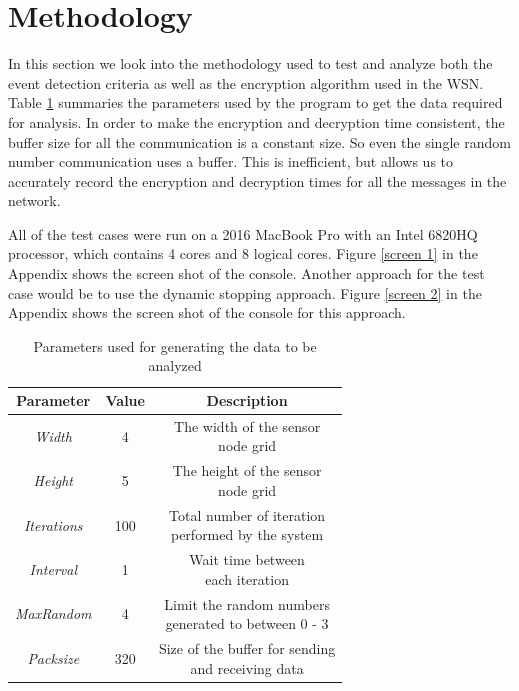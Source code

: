 \documentclass[conference]{IEEEtran}
\begin{document}
	
	\section{Methodology}\label{method}

	In this section we look into the methodology used to test and analyze both the event detection criteria as well as the encryption algorithm used in the WSN. Table \ref{params} summaries the parameters used by the program to get the data required for analysis. In order to make the encryption and decryption time consistent, the buffer size for all the communication is a constant size. So even the single random number communication uses a buffer. This is inefficient, but allows us to accurately record the encryption and decryption times for all the messages in the network.
	
	All of the test cases were run on a 2016 MacBook Pro with an Intel 6820HQ processor, which contains 4 cores and 8 logical cores. Figure \ref{screen 1} in the Appendix shows the screen shot of the console. Another approach for the test case would be to use the dynamic stopping approach. Figure \ref{screen 2} in the Appendix shows the screen shot of the console for this approach.
		
	\begin{table}[!h]\caption{Parameters used for generating the data to be analyzed}
		\begin{center}
			\renewcommand{\arraystretch}{1.2}
			\begin{tabular}{| c | c | c |} 
				\hline
				\textbf{Parameter} & \textbf{Value} & \textbf{Description} \\ \hline
				\emph{Width}    &  4   & \makecell{The width of the sensor \\ node grid }   \\ \hline
				\emph{Height}    &  5   & \makecell{The height of the sensor \\ node grid }   \\ \hline
				\emph{Iterations}    &  100   & \makecell{Total number of iteration \\ performed by the system }   \\ \hline
				\emph{Interval}    &  1   & \makecell{Wait time between \\ each iteration }   \\ \hline
				\emph{MaxRandom}    &  4   & \makecell{Limit the random numbers \\ generated to between 0 - 3 }   \\ \hline
				\emph{Packsize}    &  320  & \makecell{Size of the buffer for sending\\ and receiving data }   \\ \hline
			\end{tabular}
			\label{params}
		\end{center}
	\end{table}
\end{document}
